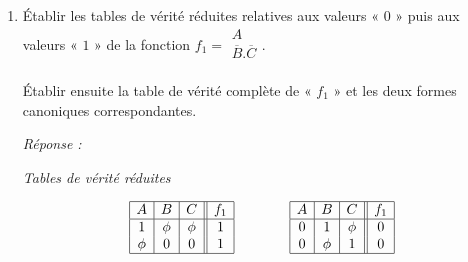 \begin{enumerate} [label=\arabic*$^\circ$]
Simplifier la fonction « $I$ » par la mise en facteur, transposition et adjacences successives   et vérifier le résultat par la méthode de  « \textsc{Karnaugh} ». 

 
\textsl{Réponse :}

\medskip

\[ I = 
\begin{array}{|c|c|} \overline{A} & \overline{D} \\ B . \overline{C} & E . \overline{F}  \\     \end{array}
\]

\item   Établir les tables de vérité réduites relatives aux valeurs « $0$ » puis aux valeurs « $1$ » de la fonction $f_1 = \begin{array}{|c|} A \\ \overline{B} . \overline{C} \\ \end{array}$.  

Établir ensuite la table de vérité complète de « $f_1$ » et les deux formes canoniques correspondantes. 

\medskip 

 \textsl{Réponse :}
 
 \medskip
\centerline{ \textsl{Tables de vérité réduites}}
\[
 \begin{array}{|c|c|c||c|} 
 	\hline
 	A & B & C & f_1 \\
 	\hline 
 	1 & \phi & \phi & 1 \\
 	\phi & 0 & 0  & 1 \\
 	\hline 
  \end{array}
   \qquad \qquad   \begin{array}{|c|c|c||c|} 
 	\hline
 	A & B & C & f_1 \\
 	\hline 
 	0  & 1  & \phi & 0  \\
 	0 & \phi & 1 & 0  \\
 	\hline 
  \end{array}
 \]
 
 \medskip 
 

\end{enumerate}
